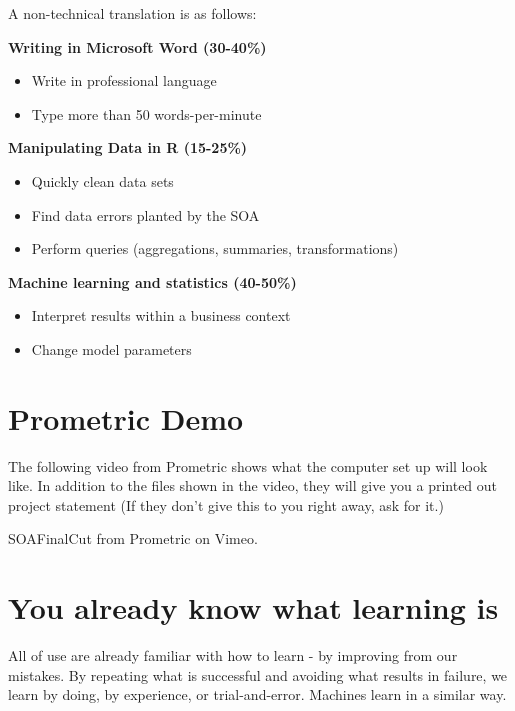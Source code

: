 \documentclass[openany]{book}
\providecommand{\tightlist}{%
  \setlength{\itemsep}{0pt}\setlength{\parskip}{0pt}}
\begin{document}
A non-technical translation is as follows:

\textbf{Writing in Microsoft Word (30-40\%)}

\begin{itemize}
\tightlist
\item
  Write in professional language
\item
  Type more than 50 words-per-minute
\end{itemize}

\textbf{Manipulating Data in R (15-25\%)}

\begin{itemize}
\tightlist
\item
  Quickly clean data sets
\item
  Find data errors planted by the SOA
\item
  Perform queries (aggregations, summaries, transformations)
\end{itemize}

\textbf{Machine learning and statistics (40-50\%)}

\begin{itemize}
\tightlist
\item
  Interpret results within a business context
\item
  Change model parameters
\end{itemize}

\hypertarget{prometric-demo}{%
\chapter{Prometric Demo}\label{prometric-demo}}

The following video from Prometric shows what the computer set up will look like. In addition to the files shown in the video, they will give you a printed out project statement (If they don't give this to you right away, ask for it.)

SOAFinalCut from Prometric on Vimeo.

\hypertarget{you-already-know-what-learning-is}{%
\chapter{You already know what learning is}\label{you-already-know-what-learning-is}}

All of use are already familiar with how to learn - by improving from our mistakes. By repeating what is successful and avoiding what results in failure, we learn by doing, by experience, or trial-and-error. Machines learn in a similar way.
\end{document}
